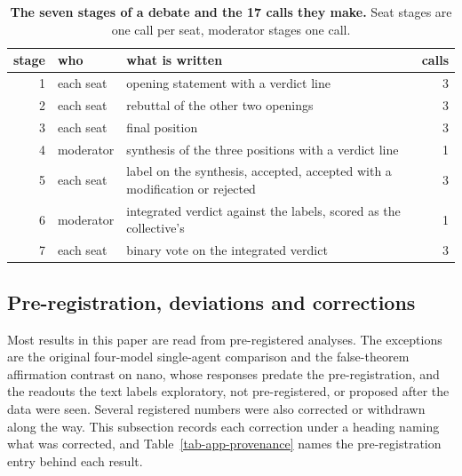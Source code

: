 \begin{table}[t]
\centering
\small
\caption{\textbf{The seven stages of a debate and the 17 calls they make.} Seat
stages are one call per seat, moderator stages one call.}
\label{tab-app-stages}
\begin{tabular}{rllr}
\toprule
stage & who & what is written & calls \\
\midrule
1 & each seat & opening statement with a verdict line & 3 \\
2 & each seat & rebuttal of the other two openings & 3 \\
3 & each seat & final position & 3 \\
4 & moderator & synthesis of the three positions with a verdict line & 1 \\
5 & each seat & label on the synthesis, accepted, accepted with a modification or rejected & 3 \\
6 & moderator & integrated verdict against the labels, scored as the collective's & 1 \\
7 & each seat & binary vote on the integrated verdict & 3 \\
\bottomrule
\end{tabular}
\end{table}

{\footnotesize

}

\subsection{Pre-registration, deviations and corrections}
\label{app-prereg}

Most results in this paper are read from pre-registered analyses. The
exceptions are the original four-model single-agent comparison and the
false-theorem affirmation contrast on nano, whose responses predate the
pre-registration, and the readouts the text labels exploratory, not
pre-registered, or proposed after the data were seen. Several registered
numbers were also corrected or withdrawn along the way. This subsection
records each correction under a heading naming what was corrected, and
Table~\ref{tab-app-provenance} names the pre-registration entry behind each
result.

